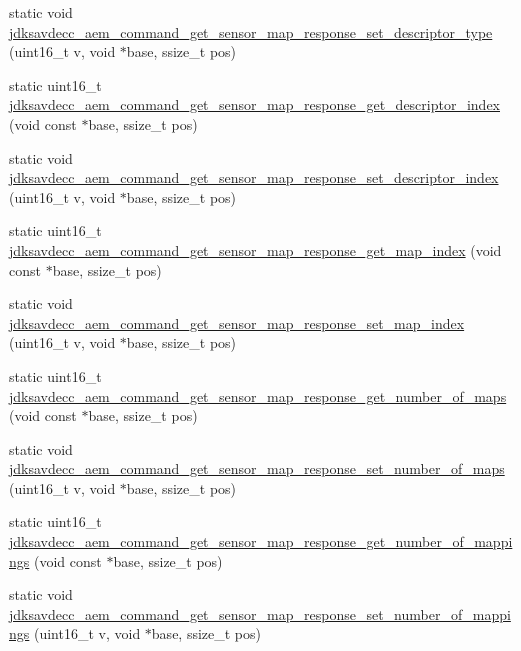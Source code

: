\begin{DoxyCompactItemize}
static void \hyperlink{group__command__get__sensor__map__response_ga2b04d5ebb1eeca914ede695946ec394a}{jdksavdecc\+\_\+aem\+\_\+command\+\_\+get\+\_\+sensor\+\_\+map\+\_\+response\+\_\+set\+\_\+descriptor\+\_\+type} (uint16\+\_\+t v, void $\ast$base, ssize\+\_\+t pos)
\item 
static uint16\+\_\+t \hyperlink{group__command__get__sensor__map__response_ga765f284ee393d086444f6b160300abac}{jdksavdecc\+\_\+aem\+\_\+command\+\_\+get\+\_\+sensor\+\_\+map\+\_\+response\+\_\+get\+\_\+descriptor\+\_\+index} (void const $\ast$base, ssize\+\_\+t pos)
\item 
static void \hyperlink{group__command__get__sensor__map__response_gaf7a7a4fbb8e5d2ce2842f3c93a19b678}{jdksavdecc\+\_\+aem\+\_\+command\+\_\+get\+\_\+sensor\+\_\+map\+\_\+response\+\_\+set\+\_\+descriptor\+\_\+index} (uint16\+\_\+t v, void $\ast$base, ssize\+\_\+t pos)
\item 
static uint16\+\_\+t \hyperlink{group__command__get__sensor__map__response_ga1cb86ddeaece9a1c0eb172e94e97bd5b}{jdksavdecc\+\_\+aem\+\_\+command\+\_\+get\+\_\+sensor\+\_\+map\+\_\+response\+\_\+get\+\_\+map\+\_\+index} (void const $\ast$base, ssize\+\_\+t pos)
\item 
static void \hyperlink{group__command__get__sensor__map__response_gaef93fbe37b35943ecdf6bf596383f3f7}{jdksavdecc\+\_\+aem\+\_\+command\+\_\+get\+\_\+sensor\+\_\+map\+\_\+response\+\_\+set\+\_\+map\+\_\+index} (uint16\+\_\+t v, void $\ast$base, ssize\+\_\+t pos)
\item 
static uint16\+\_\+t \hyperlink{group__command__get__sensor__map__response_gad233cd1aceed8d0174389b4185f515d2}{jdksavdecc\+\_\+aem\+\_\+command\+\_\+get\+\_\+sensor\+\_\+map\+\_\+response\+\_\+get\+\_\+number\+\_\+of\+\_\+maps} (void const $\ast$base, ssize\+\_\+t pos)
\item 
static void \hyperlink{group__command__get__sensor__map__response_ga374a448358af3ced4e21230756133cfd}{jdksavdecc\+\_\+aem\+\_\+command\+\_\+get\+\_\+sensor\+\_\+map\+\_\+response\+\_\+set\+\_\+number\+\_\+of\+\_\+maps} (uint16\+\_\+t v, void $\ast$base, ssize\+\_\+t pos)
\item 
static uint16\+\_\+t \hyperlink{group__command__get__sensor__map__response_ga4139555b27dba321ad55f223030ec776}{jdksavdecc\+\_\+aem\+\_\+command\+\_\+get\+\_\+sensor\+\_\+map\+\_\+response\+\_\+get\+\_\+number\+\_\+of\+\_\+mappings} (void const $\ast$base, ssize\+\_\+t pos)
\item 
static void \hyperlink{group__command__get__sensor__map__response_ga7e4a020cdccd98780591d6e2640c1663}{jdksavdecc\+\_\+aem\+\_\+command\+\_\+get\+\_\+sensor\+\_\+map\+\_\+response\+\_\+set\+\_\+number\+\_\+of\+\_\+mappings} (uint16\+\_\+t v, void $\ast$base, ssize\+\_\+t pos)

\end{DoxyCompactItemize}
